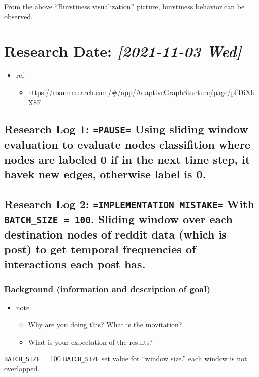 \documentclass[11pt]{article}
\begin{document}
From the above ``Burstiness visualization'' picture, burstiness behavior can be observed.

\section{Research Date: \textit{[2021-11-03 Wed]}}
\label{sec:org4a55df0}
\begin{itemize}
\item ref
\begin{itemize}
\item \url{https://roamresearch.com/\#/app/AdaptiveGraphStucture/page/pfT6XbX8F}
\end{itemize}
\end{itemize}
\subsection{Research Log 1: \texttt{=PAUSE=} Using sliding window evaluation to evaluate nodes classifition where nodes are labeled 0 if in the next time step, it havek new edges, otherwise label is 0.}
\label{sec:orgbfaf4ba}

\subsection{Research Log 2: \texttt{=IMPLEMENTATION MISTAKE=} With \texttt{BATCH\_SIZE = 100}. Sliding window over each destination nodes of reddit data (which is post) to get temporal frequencies of interactions each post has.}
\label{sec:org4236399}
\subsubsection{Background (information and description of goal)}
\label{sec:org1789ca8}
\begin{itemize}
\item note
\begin{itemize}
\item Why are you doing this? What is the movitation?
\item What is your expectation of the results?
\end{itemize}
\end{itemize}

\texttt{BATCH\_SIZE} = 100
\texttt{BATCH\_SIZE} set value for ``window size.''
each window is not overlapped.
\end{document}
